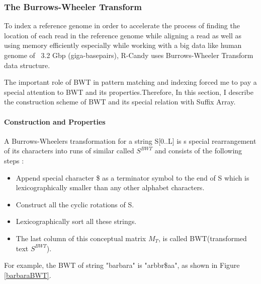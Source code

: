 \documentclass[11pt,a4paper]{report}
\begin{document}
\subsubsection{The Burrows-Wheeler Transform} \label{The Burrows-Wheeler Transform}

To index a reference genome in order to accelerate the process of finding the location of each read in the reference genome while aligning a read as well as using memory efficiently especially while working with a big data like human genome of ~3.2 Gbp (giga-basepairs), R-Candy uses Burrows-Wheeler Transform data structure.

The important role of BWT in pattern matching and indexing forced me to pay a special attention to BWT and its properties.Therefore, In this section, I describe the construction scheme of BWT and its special relation with Suffix Array.\\

\paragraph{Construction and Properties}

A Burrows-Wheelers transformation for a string S[0..L] is s special rearrangement of its characters into runs of similar called $S^{BWT}$ and consists of the following steps \cite{bwt}:

\begin{itemize} 
	\item Append special character \$ as a terminator symbol to the end of S which is lexicographically smaller than any other alphabet characters.
	\item  Construct all the cyclic rotations of S.
	\item  Lexicographically sort all these strings.
	\item The last column of this conceptual matrix \emph{$M_{T}$}, is called BWT(transformed text $S^{BWT}$).
\end{itemize}


For example, the BWT of string "barbara" is "arbbr\$aa", as shown in Figure \ref{barbaraBWT}.\\
\end{document}
